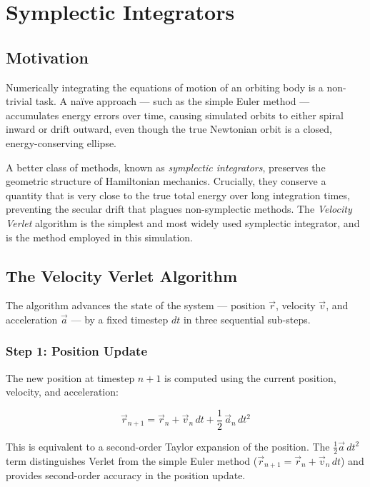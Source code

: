 \section{Symplectic Integrators}

\subsection{Motivation}

Numerically integrating the equations of motion of an orbiting body is a non-trivial task. A naïve approach — such as the simple Euler method — accumulates energy errors over time, causing simulated orbits to either spiral inward or drift outward, even though the true Newtonian orbit is a closed, energy-conserving ellipse.

A better class of methods, known as \emph{symplectic integrators}, preserves the geometric structure of Hamiltonian mechanics. Crucially, they conserve a quantity that is very close to the true total energy over long integration times, preventing the secular drift that plagues non-symplectic methods. The \emph{Velocity Verlet} algorithm is the simplest and most widely used symplectic integrator, and is the method employed in this simulation.

\subsection{The Velocity Verlet Algorithm}

The algorithm advances the state of the system — position $\vec{r}$, velocity $\vec{v}$, and acceleration $\vec{a}$ — by a fixed timestep $dt$ in three sequential sub-steps.

\subsubsection{Step 1: Position Update}

The new position at timestep $n+1$ is computed using the current position, velocity, and acceleration:

\begin{equation}
\vec{r}_{n+1} = \vec{r}_n + \vec{v}_n\,dt + \frac{1}{2}\,\vec{a}_n\,dt^2
\end{equation}

This is equivalent to a second-order Taylor expansion of the position. The $\frac{1}{2}\vec{a}\,dt^2$ term distinguishes Verlet from the simple Euler method ($\vec{r}_{n+1} = \vec{r}_n + \vec{v}_n\,dt$) and provides second-order accuracy in the position update.

